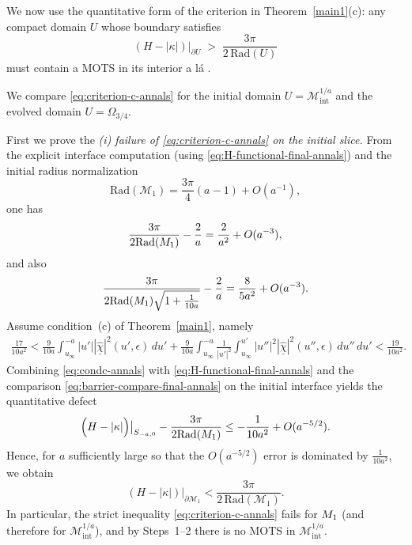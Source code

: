 \documentclass{amsart}
\begin{document}
{\noindent
We now use the quantitative form of the criterion in Theorem~\ref{main1}(c): any compact domain $U$ whose boundary satisfies
\begin{equation}\label{eq:criterion-c-annals}
(H-|\kappa|)\big|_{\partial U} \;>\; \frac{3\pi}{2\,\text{Rad}(U)}
\end{equation}
must contain a MOTS in its interior a l\'a \cite{yau}.

\noindent We compare \eqref{eq:criterion-c-annals} for the initial domain $U=\mathcal M^{1/a}_{\mathrm{int}}$ and the evolved domain $U=\Omega_{3/4}$.

\smallskip

\noindent First we prove the \emph{(i) failure of \eqref{eq:criterion-c-annals} on the initial slice.}
From the explicit interface computation (using \eqref{eq:H-functional-final-annals}) and the initial radius normalization 
\[\text{Rad}(\mathcal{M}_{1})=\frac{3\pi}{4}(a-1)+O(a^{-1}),\] one has
\begin{equation}\label{eq:1-annals}
\frac{3\pi}{2\text{Rad}(\mathcal \mathcal{M}_{1})}-\frac{2}{a}
=\frac{2}{ a^2}+O(a^{-3}),
\end{equation}
and also
\begin{equation}\label{eq:2-annals}
\frac{3\pi}{2\text{Rad}(\mathcal \mathcal{M}_{1})\sqrt{1+\frac{1}{10a}}}-\frac{2}{a}
=\frac{8}{5 a^2}+O(a^{-3}).
\end{equation}
Assume condition~(c) of Theorem~\ref{main1}, namely
\begin{align}\label{eq:condc-annals}
\frac{17}{10 a^{2}}
<
\frac{9}{10a}\int_{u_{\infty}}^{-a}|u'||\underline{\hat\chi}|^{2}(u',\epsilon)\,du'
+\frac{9}{10a}\int_{u_{\infty}}^{-a}\frac{1}{|u'|^{2}}\int_{u_{\infty}}^{u'}|u''|^{2}|\underline{\hat\chi}|^{2}(u'',\epsilon)\,du''\,du'
<
\frac{19}{10 a^{2}}.
\end{align}
Combining \eqref{eq:condc-annals} with \eqref{eq:H-functional-final-annals} and the comparison \eqref{eq:barrier-compare-final-annals} on the initial interface yields the quantitative defect
\begin{equation}\label{eq:yau-defect-annals}
\Big(H-|\kappa|\Big)\big|_{S_{-a,0}}
-\frac{3\pi}{2\text{Rad}(\mathcal \mathcal{M}_{1})}
\le
-\frac{1}{10 a^2}+O(a^{-5/2}).
\end{equation}
Hence, for $a$ sufficiently large so that the $O(a^{-5/2})$ error is dominated by $\frac{1}{10 a^2}$, we obtain
\begin{equation}\label{eq:initial-barrier-ineq-final-annals}
(H-|\kappa|)\big|_{\partial \mathcal M_{1}}
<
\frac{3\pi}{2\,\text{Rad}(\mathcal M_{1})}.
\end{equation}
In particular, the strict inequality \eqref{eq:criterion-c-annals} fails for $\mathcal \mathcal{M}_{1}$ (and therefore for $\mathcal M^{1/a}_{\mathrm{int}}$), and by Steps~1--2 there is no MOTS in $\mathcal M^{1/a}_{\mathrm{int}}$.

}
\end{document}
